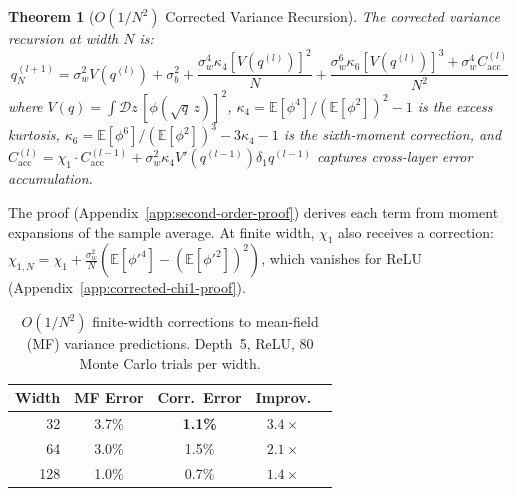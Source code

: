 \documentclass[10pt]{article}
\newcommand{\EE}{\mathbb{E}}
\newtheorem{theorem}{Theorem}
\begin{document}
\begin{theorem}[$O(1/N^2)$ Corrected Variance Recursion]
\label{thm:second-order-correction}
The corrected variance recursion at width $N$ is:
\begin{equation}
    q^{(l+1)}_N = \sigma_w^2 V(q^{(l)}) + \sigma_b^2 + \frac{\sigma_w^4 \kappa_4 [V(q^{(l)})]^2}{N} + \frac{\sigma_w^6 \kappa_6 [V(q^{(l)})]^3 + \sigma_w^4 C_{\mathrm{acc}}^{(l)}}{N^2}
    \label{eq:second-order-correction}
\end{equation}
where $V(q) = \int \mathcal{D}z\, [\phi(\sqrt{q}\, z)]^2$, $\kappa_4 = \EE[\phi^4]/(\EE[\phi^2])^2 - 1$ is the excess kurtosis, $\kappa_6 = \EE[\phi^6]/(\EE[\phi^2])^3 - 3\kappa_4 - 1$ is the sixth-moment correction, and $C_{\mathrm{acc}}^{(l)} = \chi_1 \cdot C_{\mathrm{acc}}^{(l-1)} + \sigma_w^2 \kappa_4 V'(q^{(l-1)}) \delta_1 q^{(l-1)}$ captures cross-layer error accumulation.
\end{theorem}

The proof (Appendix~\ref{app:second-order-proof}) derives each term from moment expansions of the sample average.
At finite width, $\chi_1$ also receives a correction: $\chi_{1,N} = \chi_1 + \frac{\sigma_w^2}{N}(\EE[\phi'^4] - (\EE[\phi'^2])^2)$, which vanishes for ReLU (Appendix~\ref{app:corrected-chi1-proof}).

\begin{table}[t]
\centering
\caption{$O(1/N^2)$ finite-width corrections to mean-field (MF) variance predictions. Depth~5, ReLU, 80 Monte Carlo trials per width.}
\label{tab:finite-width}
\small
\begin{tabular}{@{}rcccc@{}}
\toprule
\textbf{Width} & \textbf{MF Error} & \textbf{Corr.\ Error} & \textbf{Improv.} \\
\midrule
32   & 3.7\% & \textbf{1.1\%}  & $3.4\times$ \\
64   & 3.0\%  & 1.5\%  & $2.1\times$ \\
128  & 1.0\%  & 0.7\%  & $1.4\times$ \\
\bottomrule
\end{tabular}
\end{table}
\end{document}
